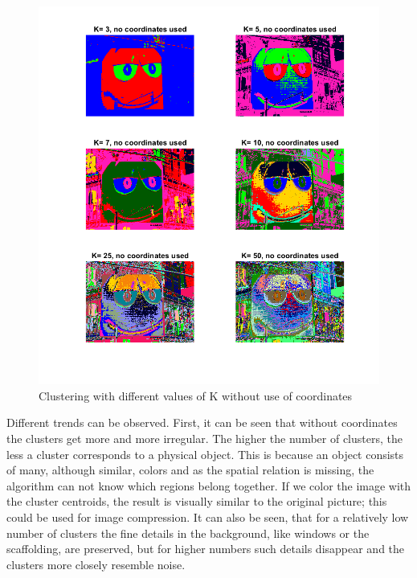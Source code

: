 \begin{figure}[h!]
\centering
\includegraphics[width =0.8\linewidth]{figures/task2/mm_nocoords_manyK.png}
\caption{Clustering with different values of K without use of coordinates}
\label{fig:mm:nocoords:manyK}
\end{figure}

Different trends can be observed. First, it can be seen that without coordinates the clusters get more and more irregular. The higher the number of clusters, the less a cluster corresponds to a physical object. This is because an object consists of many, although similar, colors and as the spatial relation is missing, the algorithm can not know which regions belong together. If we color the image with the cluster centroids, the result is visually similar to the original picture; this could be used for image compression. It can also be seen, that for a relatively low number of clusters the fine details in the background, like windows or the scaffolding, are preserved, but for higher numbers such details disappear and the clusters more closely resemble noise.

